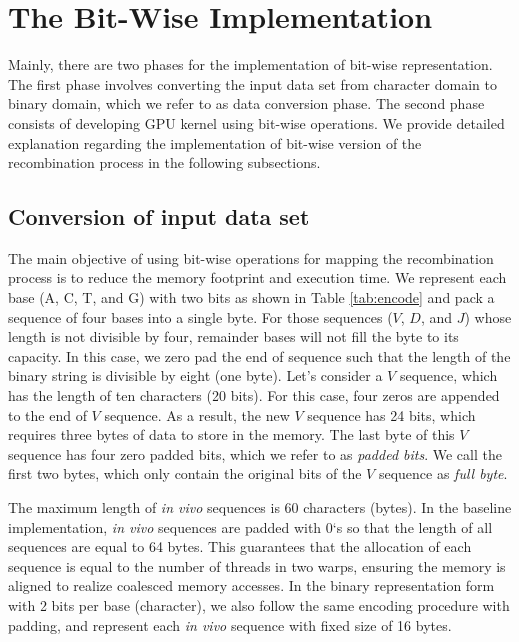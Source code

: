 \section {The Bit-Wise Implementation }\label{sec:bitwise}
Mainly, there are two phases for the implementation of bit-wise representation. The first phase involves converting the input data set from character domain to binary domain, which we refer to as data conversion phase. The second phase consists of developing GPU kernel using bit-wise operations. We provide detailed explanation regarding the implementation of bit-wise version of the recombination process in the following subsections. 

\subsection {Conversion of input data set}
The main objective of using bit-wise operations for mapping the recombination process is to reduce the memory footprint and execution time. We represent each base (A, C, T, and G) with two bits as shown in Table \ref{tab:encode} and pack a sequence of four bases into a single byte. For those sequences ($V$, $D$, and $J$) whose length is not divisible by four, remainder bases will not fill the byte to its capacity. In this case, we zero pad the end of sequence such that the length of the binary string is divisible by eight (one byte). Let's consider a $V$ sequence, which has the length of ten characters (20 bits). For this case, four zeros are appended to the end of $V$ sequence. As a result, the new $V$ sequence has 24 bits, which requires three bytes of data to store in the memory. The last byte of this $V$ sequence has four zero padded bits, which we refer to as \emph{padded bits}. We call the first two bytes, which only contain the original bits of the $V$ sequence as \emph{full byte}. 

The maximum length of \emph{in vivo} sequences is 60 characters (bytes). In the baseline implementation, \emph{in vivo} sequences are padded with $0$`s so that the length of all sequences are equal to 64 bytes. This guarantees that the allocation of each sequence is equal to the number of threads in two warps, ensuring the memory is aligned to realize coalesced memory accesses. In the binary representation form with 2 bits per base (character), we also follow the same encoding procedure with padding, and represent each \emph{in vivo} sequence with fixed size of 16 bytes.

